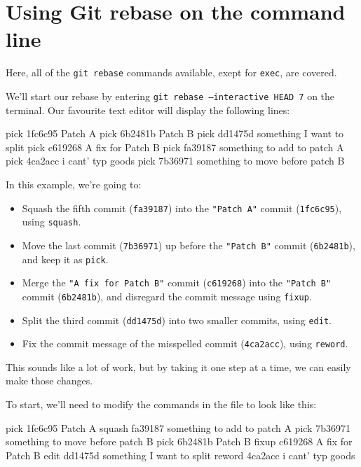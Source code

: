 \newpage
\section{Using Git rebase on the command line}

Here, all of the \texttt{git rebase} commands available, exept for \texttt{exec}, are covered. 

We'll start our rebase by entering \texttt{git rebase --interactive HEAD~7} on the terminal. Our favourite text editor will display the following lines:
\begin{codeblock}[language=bash]
pick 1fc6c95 Patch A
pick 6b2481b Patch B
pick dd1475d something I want to split
pick c619268 A fix for Patch B
pick fa39187 something to add to patch A
pick 4ca2acc i cant' typ goods
pick 7b36971 something to move before patch B
\end{codeblock}

In this example, we're going to:
\begin{itemize}
    \item Squash the fifth commit (\texttt{fa39187}) into the \texttt{"Patch A"} commit (\texttt{1fc6c95}), using \texttt{squash}.
    \item Move the last commit (\texttt{7b36971}) up before the \texttt{"Patch B"} commit (\texttt{6b2481b}), and keep it as \texttt{pick}.
    \item Merge the \texttt{"A fix for Patch B"} commit (\texttt{c619268}) into the \texttt{"Patch B"} commit (\texttt{6b2481b}), and disregard the commit message using \texttt{fixup}.
    \item Split the third commit (\texttt{dd1475d}) into two smaller commits, using \texttt{edit}.
    \item Fix the commit message of the misspelled commit (\texttt{4ca2acc}), using \texttt{reword}.
\end{itemize}

This sounds like a lot of work, but by taking it one step at a time, we can easily make those changes. 

To start, we'll need to modify the commands in the file to look like this:

\begin{codeblock}[language=bash]
pick 1fc6c95 Patch A
squash fa39187 something to add to patch A
pick 7b36971 something to move before patch B
pick 6b2481b Patch B
fixup c619268 A fix for Patch B
edit dd1475d something I want to split
reword 4ca2acc i cant' typ goods
\end{codeblock}

